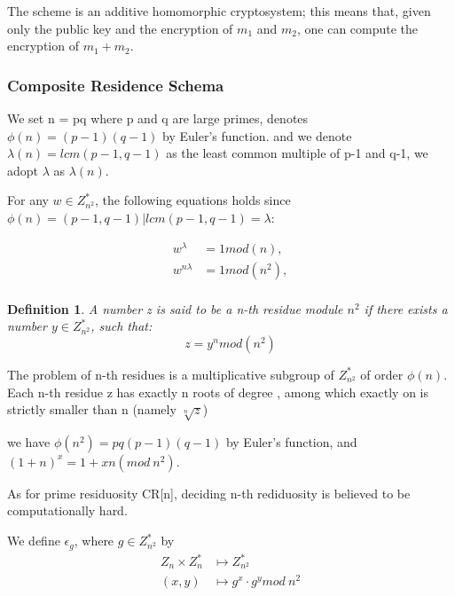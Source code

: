 \documentclass[a4paper,11pt]{article}
\newtheorem{myDef}{Definition}
\begin{document}
The scheme is an additive homomorphic cryptosystem; this means that, given only the public key and the encryption of $m_{1}$ and $m_{2}$, one can compute the encryption of $m_{1}+m_{2}$.

\subsubsection{Composite Residence Schema}

We set n = pq where p and q are large primes,  denotes $\phi(n) = (p-1)(q-1)$ by Euler's function. and we denote $\lambda(n) = lcm(p-1, q-1)$ as the least common multiple of p-1 and q-1, we adopt $\lambda$ as $\lambda(n)$.

For any $w \in Z_{n^2}^{*}$,  the following equations holds since $\phi(n) = (p-1, q-1) | lcm(p-1, q-1) = \lambda$:

\begin{equation}
\begin{split}
w^{\lambda} &= 1 mod(n),  \\
w^{n\lambda} &= 1 mod(n^2),  \\
\end{split}
\end{equation}


\begin{myDef}
    A number z is said to be a n-th residue module $n^2$ if there exists a number  $y \in Z_{n^2}^{*}$, such that:
    \begin {equation}
    	z = y^n mod (n^2)
    \end {equation}
\end{myDef}

The problem of n-th residues is a multiplicative subgroup of $Z_{n^2}^{*}$ of order $\phi(n)$. Each n-th residue z has exactly n roots of degree , among which exactly on is strictly smaller than n (namely $\sqrt[n]{z}$)

we have $\phi(n^2) = pq(p-1)(q-1)$  by Euler's function, and $(1+n)^x = 1+xn (mod\ n^2)$.  

As for prime residuosity CR[n], deciding n-th rediduosity is believed to be computationally hard. 

We define $\epsilon_g$,  where $g  \in Z_{n^2}^{*}$ by 
\begin{equation}
\begin{split}
Z_n \times Z_{n}^{*} &\mapsto Z_{n^2}^{*} \\
(x, y) &\mapsto g^x \cdot {g^y} mod\ n^2 \\
\end{split}
\end{equation}
\end{document}
